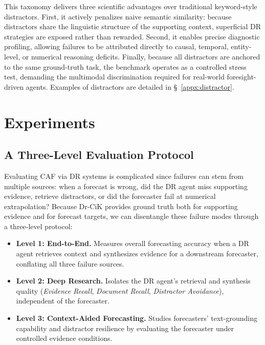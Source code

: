 \documentclass[]{servicenow}
\begin{document}
This taxonomy delivers three scientific advantages over traditional keyword-style distractors. First, it actively penalizes naive semantic similarity: because distractors share the linguistic structure of the supporting context, superficial DR strategies are exposed rather than rewarded. Second, it enables precise diagnostic profiling, allowing failures to be attributed directly to causal, temporal, entity-level, or numerical reasoning deficits. Finally, because all distractors are anchored to the same ground-truth task, the benchmark operates as a controlled stress test, demanding the multimodal discrimination required for real-world foresight-driven agents. Examples of distractors are detailed in \S~\ref{appx:distractor}.




\section{Experiments}
\label{sec:experiments}

\subsection{A Three-Level Evaluation Protocol}
\label{sec:evaluation_protocol}
Evaluating CAF via DR systems is complicated since failures can stem from multiple sources: when a forecast is wrong, did the DR agent miss supporting evidence, retrieve distractors, or did the forecaster fail at numerical extrapolation? 
Because Dr-CiK provides ground truth both for supporting evidence and for forecast targets, we can disentangle these failure modes through a three-level protocol:




\begin{itemize}[leftmargin=*]

\item \textbf{Level 1: End-to-End.} Measures overall forecasting accuracy when a DR agent retrieves context and synthesizes evidence for a downstream forecaster, conflating all three failure sources.

\item \textbf{Level 2: Deep Research.} Isolates the DR agent's retrieval and synthesis quality (\emph{Evidence Recall}, \emph{Document Recall}, \emph{Distractor Avoidance}), independent of the forecaster.

\item \textbf{Level 3: Context-Aided Forecasting.} Studies forecasters' text-grounding capability and distractor resilience by evaluating the forecaster under controlled evidence conditions.

\end{itemize}
\end{document}
